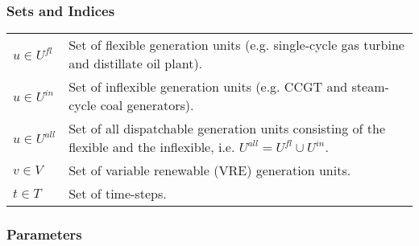 \documentclass{article}
\begin{document}
\subsubsection*{Sets and Indices}
\begin{table}[h]
    \label{tab:mip_sets}
    \centering
    \begin{tabular}{ l p{10cm} }
        $u \in U^{fl}$  & Set of flexible generation units (e.g. single-cycle gas turbine and distillate oil plant). \\
        $u \in U^{in}$  & Set of inflexible generation units (e.g. CCGT and steam-cycle coal generators). \\
        $u \in U^{all}$  & Set of all dispatchable generation units consisting of the flexible and the inflexible, i.e. $U^{all} = U^{fl} \cup U^{in}$. \\
        $v \in V$  & Set of variable renewable (VRE) generation units. \\
        $t \in T$       & Set of time-steps. \\
    \end{tabular}
\end{table}
\newpage

\subsubsection*{Parameters}
\end{document}
